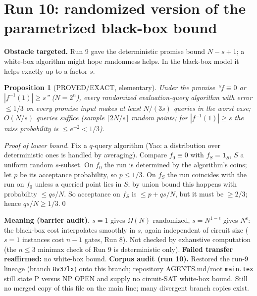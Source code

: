 \documentclass[11pt]{article}
\newtheorem{prop}{Proposition}
\begin{document}
\section{Run 10: randomized version of the parametrized black-box bound}\label{sec:r10}
\textbf{Obstacle targeted.} Run 9 gave the deterministic promise bound $N-s+1$; a white-box algorithm might hope randomness helps. In the black-box model it helps exactly up to a factor $s$.
\begin{prop}[PROVED/EXACT, elementary] Under the promise ``$f\equiv0$ or $|f^{-1}(1)|\ge s$'' ($N=2^n$), every randomized evaluation-query algorithm with error $\le1/3$ on every promise input makes at least $N/(3s)$ queries in the worst case; $O(N/s)$ queries suffice (sample $\lceil 2N/s\rceil$ random points; for $|f^{-1}(1)|\ge s$ the miss probability is $\le e^{-2}<1/3$).
\end{prop}
\emph{Proof of lower bound.} Fix a $q$-query algorithm (Yao: a distribution over deterministic ones is handled by averaging). Compare $f_0\equiv0$ with $f_S=\mathbf 1_S$, $S$ a uniform random $s$-subset. On $f_0$ the run is determined by the algorithm's coins; let $p$ be its acceptance probability, so $p\le1/3$. On $f_S$ the run coincides with the run on $f_0$ unless a queried point lies in $S$; by union bound this happens with probability $\le qs/N$. So acceptance on $f_S$ is $\le p+qs/N$, but it must be $\ge2/3$; hence $qs/N\ge1/3$.\qed

\textbf{Meaning (barrier audit).} $s=1$ gives $\Omega(N)$ randomized, $s=N^{1-\epsilon}$ gives $N^{\epsilon}$: the black-box cost interpolates smoothly in $s$, again independent of circuit size ($s=1$ instances cost $n-1$ gates, Run 8). Not checked by exhaustive computation (the $n\le3$ minimax check of Run 9 is deterministic only). \textbf{Failed transfer reaffirmed:} no white-box bound. \textbf{Corpus audit (run 10).} Restored the run-9 lineage (branch \texttt{8v37lx}) onto this branch; repository AGENTS.md/root \texttt{main.tex} still state P versus NP OPEN and supply no circuit-SAT white-box bound. Still no merged copy of this file on the main line; many divergent branch copies exist.
\end{document}
